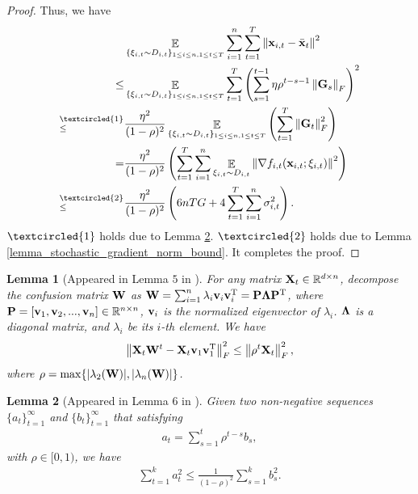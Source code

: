 \documentclass{article}
\newtheorem{Lemma}{\bf{Lemma}}
\begin{document}
\begin{proof}
Thus, we  have
\begin{align}
\nonumber
& \EE_{ \{ \xi_{i,t} \sim D_{i,t} \}_{1\le i\le n,1\le t \le T} } \sum_{i=1}^n\sum_{t=1}^T \lrnorm{\x_{i,t} - \bar{\x}_t}^2  \\ \nonumber 
\le & \EE_{ \{ \xi_{i,t} \sim D_{i,t} \}_{1\le i\le n,1\le t \le T} } \sum_{t=1}^T \lrincir{ \sum_{s=1}^{t-1} \eta \rho^{t-s-1} \lrnorm{\G_s}_F}^2  \\ \nonumber
\refabovecir{\le}{\textcircled{1}} & \frac{\eta^2}{(1-\rho)^2} \EE_{ \{ \xi_{i,t} \sim D_{i,t} \}_{1\le i\le n,1\le t \le T} } \lrincir{  \sum_{t=1}^T \lrnorm{\G_t}_F^2 } \\ \nonumber
= & \frac{\eta^2}{(1-\rho)^2} \lrincir{  \sum_{t=1}^T \sum_{i=1}^n \EE_{ \xi_{i,t} \sim D_{i,t} } \lrnorm{\nabla f_{i,t}(\x_{i,t}; \xi_{i,t})}^2 } \\ \nonumber
\refabovecir{\le}{\textcircled{2}} & \frac{\eta^2}{(1-\rho)^2} \lrincir{  6nTG + 4\sum_{t=1}^T\sum_{i=1}^n \sigma_{i,t}^2 }.
\end{align} $\textcircled{1}$ holds due to Lemma \ref{lemma_hanlin_2}. $\textcircled{2}$ holds due to Lemma \ref{lemma_stochastic_gradient_norm_bound}.
It completes the proof.


\end{proof}








\begin{Lemma}[Appeared in Lemma $5$ in \citep{Tang:2018un}]
\label{lemma_hanlin_1}
For any matrix ${\bf X}_t\in\mathbb{R}^{d\times n}$, decompose the confusion matrix ${\bf W}$ as ${\bf W} = \sum_{i=1}^n \lambda_i {\bf v}_i {\bf v}_i^{\rm T} = {\bf P} \mathbf{\Lambda} {\bf P}^{\rm T}$, where ${\bf P} = [{\bf v}_1, {\bf v}_2, ..., {\bf v}_n]\in\mathbb{R}^{n\times n}$, ${\bf v}_i$ is the normalized eigenvector of $\lambda_i$. $\mathbf{\Lambda}$ is a diagonal matrix, and $\lambda_i$ be its $i$-th element. We have
\begin{align}
\nonumber
\left\lVert{\bf X}_t {\bf W}^t - {\bf X}_t {\bf v}_1 {\bf v}_1^{\rm T} \right\rVert_F^2 \le \left\lVert\rho^t {\bf X}_t\right\rVert_F^2, 
\end{align} where  $\rho = \max \{| \lambda_2({\bf W}) |, | \lambda_n({\bf W}) |\}$. 

\end{Lemma}


\begin{Lemma}[Appeared in Lemma $6$ in \citep{Tang:2018un}]
\label{lemma_hanlin_2}
Given two non-negative sequences $\{a_t\}_{t=1}^{\infty}$ and $\{b_t\}_{t=1}^{\infty}$ that satisfying
\begin{align}
\nonumber
a_t = \sum_{s=1}^t \rho^{t-s} b_s,
\end{align} with $\rho \in [0,1)$, we have
\begin{align}
\nonumber
\sum_{t=1}^k a_t^2 \le \frac{1}{(1-\rho)^2}\sum_{s=1}^k b_s^2.
\end{align}
\end{Lemma}


















\end{document}
